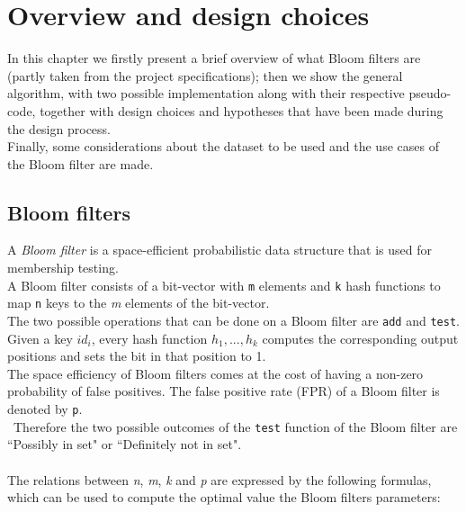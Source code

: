 %       
%
\chapter{Overview and design choices}\label{ch:design}
In this chapter we firstly present a brief overview of what Bloom filters are (partly taken from the project specifications); then we show the general algorithm, with two possible implementation along with their respective pseudo-code, together with design choices and hypotheses that have been made during the design process.\\
Finally, some considerations about the dataset to be used and the use cases of the Bloom filter are made.\\

\section{Bloom filters}
A \textit{Bloom filter} is a space-efficient probabilistic data structure that is used for membership testing.\\
A Bloom filter consists of a bit-vector with \colorbox{gray!30}{\large \texttt{m}} elements and \colorbox{gray!30}{\large \texttt{k}} hash functions to map \colorbox{gray!30}{\large \texttt{n}} keys to the \textit{m} elements of the bit-vector.\\
The two possible operations that can be done on a Bloom filter are \texttt{add} and \texttt{test}.\\
Given a key \textit{$id_{i}$}, every hash function \textit{$h_{1}, ..., h_{k}$} computes the corresponding output positions and sets the bit in that position to 1.\\
The space efficiency of Bloom filters comes at the cost of having a non-zero probability of false positives. The false positive rate (FPR) of a Bloom filter is denoted by \colorbox{gray!30}{\large \texttt{p}}.\\\
Therefore the two possible outcomes of the \texttt{test} function of the Bloom filter are ``Possibly in set" or ``Definitely not in set".\\
\\
\noindent The relations between \textit{n}, \textit{m}, \textit{k} and \textit{p} are expressed by the following formulas, which can be used to compute the optimal value the Bloom filters parameters:

